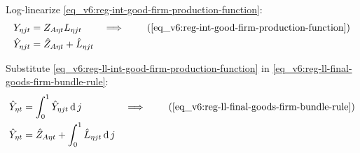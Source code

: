 \documentclass[../thesis.tex]{subfiles}
\begin{document}
\begin{comment}
	Log-linearize \ref{eq_v6:reg-int-good-firm-production-function}:
	\begin{alignat}{2}
		Y_{\eta jt} &= Z_{A\eta t} K_{\eta jt}^{\alpha_{\eta}} L_{\eta jt}^{1-\alpha_{\eta}} &\implies \tag{\ref{eq_v6:reg-int-good-firm-production-function}} \\
		Y_{\eta j} (1+ \hat{Y}_{\eta jt}) &= Z_{A\eta} K_{\eta j}^{\alpha_{\eta}} L_{\eta j}^{1-\alpha_{\eta}} (1+ \hat{Z}_{A\eta t} + {\alpha_{\eta}} \hat{K}_{\eta jt} + (1-\alpha_{\eta}) \hat{L}_{\eta jt}) &\implies \nonumber \\
		\hat{Y}_{\eta jt} &= \hat{Z}_{A\eta t} + {\alpha_{\eta}} \hat{K}_{\eta jt} + (1-\alpha_{\eta}) \hat{L}_{\eta jt} %
	\end{alignat}
	
	Substitute \ref{eq_v6:reg-ll-int-good-firm-production-function} in \ref{eq_v6:reg-ll-final-goods-firm-bundle-rule}:
	\begin{alignat}{2}
		\hat{Y}_{\eta t} &= \int_{0}^{1} \hat{Y}_{\eta jt} \dif j &\implies \tag{\ref{eq_v6:reg-ll-final-goods-firm-bundle-rule}} \\
		\hat{Y}_{\eta t} &= \int_{0}^{1} \left[ \hat{Z}_{A\eta t} + {\alpha_{\eta}} \hat{K}_{\eta jt} + (1-\alpha_{\eta}) \hat{L}_{\eta jt} \right] \dif j &\implies \nonumber \\
		\hat{Y}_{\eta t} &= \hat{Z}_{A\eta t} + {\alpha_{\eta}} \int_{0}^{1} \hat{K}_{\eta jt} \dif j + (1-\alpha_{\eta}) \int_{0}^{1} \hat{L}_{\eta jt} \dif j %
	\end{alignat}
\end{comment}

Log-linearize \ref{eq_v6:reg-int-good-firm-production-function}:
\begin{alignat}{2}
	Y_{\eta jt} &= Z_{A\eta t} L_{\eta jt} &\implies \tag{\ref{eq_v6:reg-int-good-firm-production-function}} \\
	\hat{Y}_{\eta jt} &= \hat{Z}_{A\eta t} + \hat{L}_{\eta jt} \label{eq_v6:reg-ll-int-good-firm-production-function}
\end{alignat}

Substitute \ref{eq_v6:reg-ll-int-good-firm-production-function} in \ref{eq_v6:reg-ll-final-goods-firm-bundle-rule}:
\begin{alignat}{2}
	\hat{Y}_{\eta t} &= \int_{0}^{1} \hat{Y}_{\eta jt} \dif j &\implies \tag{\ref{eq_v6:reg-ll-final-goods-firm-bundle-rule}} \\
	\hat{Y}_{\eta t} &= \hat{Z}_{A\eta t} + \int_{0}^{1} \hat{L}_{\eta jt} \dif j \label{eq_v6:reg-ll-final-goods-firm-bundle-rule-2}
\end{alignat}
\end{document}
